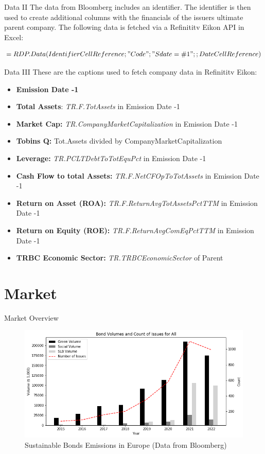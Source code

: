 \documentclass[
	8pt, %
]{beamer}
\begin{document}
\begin{frame}{Data II}
 The data from Bloomberg includes an identifier. The identifier is then used to create additional columns with the financials of the issuers ultimate parent company. The following data is fetched via a Refinititv Eikon API in Excel:
 
 \begin{align}
    =RDP.Data(Identifier Cell Reference;"Code";"Sdate=\#1";;Date Cell Reference) 
 \end{align}
\end{frame}

\begin{frame}{Data III}
These are the captions used to fetch company data in Refinititv Eikon:
\begin{itemize}
    \item \textbf{Emission Date -1}
    \item \textbf{Total Assets}: \textit{TR.F.TotAssets} in Emission Date -1
    \item \textbf{Market Cap:} \textit{TR.CompanyMarketCapitalization} in Emission Date -1
    \item \textbf{Tobins Q: }Tot.Assets divided by CompanyMarketCapitalization
    \item \textbf{Leverage:} \textit{TR.PCLTDebtToTotEquPct} in Emission Date -1
    \item \textbf{Cash Flow to total Assets:} \textit{TR.F.NetCFOpToTotAssets} in Emission Date -1
    \item \textbf{Return on Asset (ROA):} \textit{TR.F.ReturnAvgTotAssetsPctTTM} in Emission Date -1
    \item \textbf{Return on Equity (ROE):} \textit{TR.F.ReturnAvgComEqPctTTM} in Emission Date -1
    \item \textbf{TRBC Economic Sector:} \textit{TR.TRBCEconomicSector} of Parent
\end{itemize}
    
\end{frame}
\section{Market}
\begin{frame}{Market Overview}
    \begin{figure}[H]
    \centering
    \includegraphics[width=0.85\linewidth]{VolumeCount.png}
    \caption{Sustainable Bonds Emissions in Europe (Data from Bloomberg)}
\label{fig:market}
\end{figure}
\end{frame}
\end{document}
